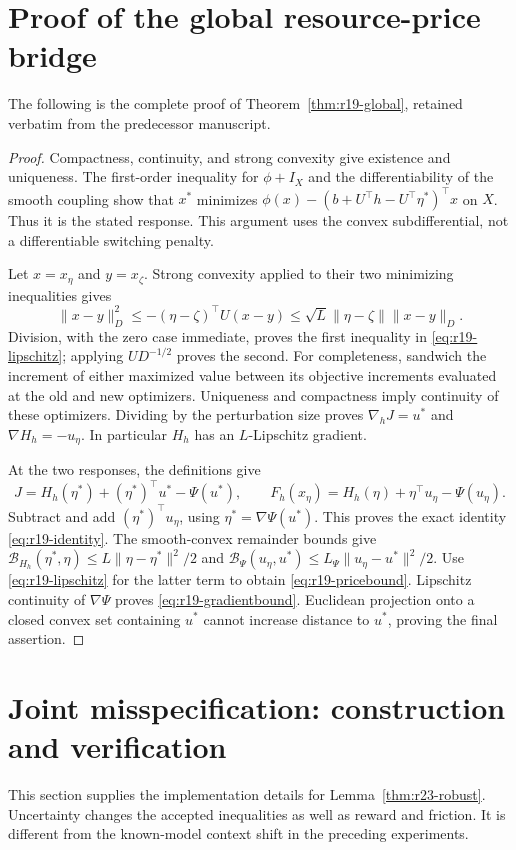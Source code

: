 \documentclass[11pt,letterpaper]{article}
\theoremstyle{definition}
\newcommand{\1}{\mathbf 1}
\begin{document}
\section{Proof of the global resource-price bridge}\label{ec:r23-preserved-global-proof}
The following is the complete proof of Theorem~\ref{thm:r19-global}, retained verbatim from the predecessor manuscript.
\begin{proof}
Compactness, continuity, and strong convexity give existence and uniqueness. The first-order inequality for $\phi+I_X$ and the differentiability of the smooth coupling show that $x^*$ minimizes $\phi(x)-(b+U^\top h- U^\top\eta^*)^\top x$ on $X$. Thus it is the stated response. This argument uses the convex subdifferential, not a differentiable switching penalty.

Let $x=x_\eta$ and $y=x_\zeta$. Strong convexity applied to their two minimizing inequalities gives
\[
 \|x-y\|_D^2\leq-(\eta-\zeta)^\top U(x-y)
 \leq\sqrt L\|\eta-\zeta\|\|x-y\|_D.
\]
Division, with the zero case immediate, proves the first inequality in \eqref{eq:r19-lipschitz}; applying $UD^{-1/2}$ proves the second. For completeness, sandwich the increment of either maximized value between its objective increments evaluated at the old and new optimizers. Uniqueness and compactness imply continuity of these optimizers. Dividing by the perturbation size proves $\nabla_hJ=u^*$ and $\nabla H_h=-u_\eta$. In particular $H_h$ has an $L$-Lipschitz gradient.

At the two responses, the definitions give
\[
 J=H_h(\eta^*)+(\eta^*)^\top u^*-\Psi(u^*),\qquad
 F_h(x_\eta)=H_h(\eta)+\eta^\top u_\eta-\Psi(u_\eta).
\]
Subtract and add $(\eta^*)^\top u_\eta$, using $\eta^*=\nabla\Psi(u^*)$. This proves the exact identity \eqref{eq:r19-identity}. The smooth-convex remainder bounds give
$\mathcal B_{H_h}(\eta^*,\eta)\leq L\|\eta-\eta^*\|^2/2$ and
$\mathcal B_\Psi(u_\eta,u^*)\leq L_\Psi\|u_\eta-u^*\|^2/2$.
Use \eqref{eq:r19-lipschitz} for the latter term to obtain \eqref{eq:r19-pricebound}. Lipschitz continuity of $\nabla\Psi$ proves \eqref{eq:r19-gradientbound}. Euclidean projection onto a closed convex set containing $u^*$ cannot increase distance to $u^*$, proving the final assertion.
\end{proof}

\section{Joint misspecification: construction and verification}\label{ec:r23-robust}
This section supplies the implementation details for Lemma~\ref{thm:r23-robust}. Uncertainty changes the accepted inequalities as well as reward and friction. It is different from the known-model context shift in the preceding experiments.
\end{document}

